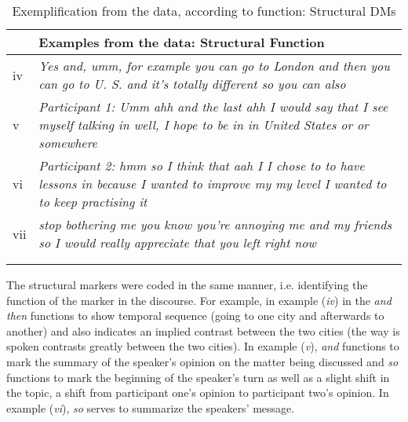 \documentclass[output=paper]{langsci/langscibook}
\begin{document}
\begin{table}
\caption{\label{tab:ament:3} Exemplification from the data, according to function: Structural DMs}

\begin{tabularx}{\textwidth}{lQ}
\lsptoprule
&\bfseries Examples from the data: Structural Function\\
\midrule

iv &  \textit{Yes and, umm, for example you can go to London and then you can go to U. S. and it’s totally different so you can also}
\\
v &  \textit{Participant 1: Umm ahh and the last ahh I would say that I see myself talking  in well, I hope to be in in United States or or somewhere}\\

vi & \textit{Participant 2: hmm so I think that aah I I chose to to have lessons in  because I wanted to improve my my level I wanted to to keep practising it}\\

vii &  \textit{stop bothering me you know you’re annoying me and my friends so I would really appreciate that you left right now}\\\\
\lspbottomrule
\end{tabularx}
\end{table}


The structural markers were coded in the same manner, i.e. identifying the function of the marker in the discourse. For example, in example (\textit{iv}) in  the  \textit{and then} functions to show temporal sequence (going to one city and afterwards to another) and  also indicates an implied contrast between the two cities (the way  is spoken contrasts greatly between the two cities).  In example (\textit{v}), \textit{and} functions to mark the summary of the speaker’s opinion on the matter being discussed and \textit{so} functions to mark the beginning of the speaker’s turn as well as a slight shift in the topic, a shift from participant one’s opinion to participant two’s opinion. In example (\textit{vi}), \textit{so} serves to summarize the speakers’ message. 
\end{document}
